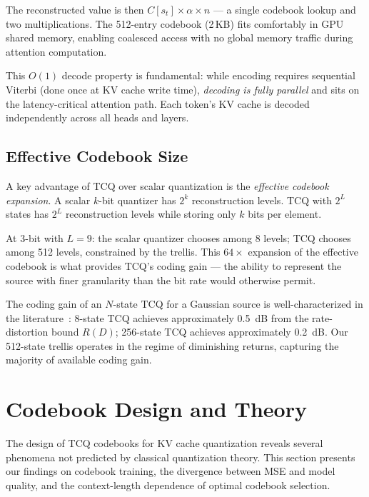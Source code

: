\documentclass{article}
\begin{document}
The reconstructed value is then $C[s_t] \times \alpha \times n$ — a single
codebook lookup and two multiplications. The 512-entry codebook (2\,KB) fits
comfortably in GPU shared memory, enabling coalesced access with no global
memory traffic during attention computation.

This $O(1)$ decode property is fundamental: while encoding requires sequential
Viterbi (done once at KV cache write time), \emph{decoding is fully parallel}
and sits on the latency-critical attention path. Each token's KV cache is
decoded independently across all heads and layers.

\subsection{Effective Codebook Size}
\label{sec:effective_codebook}

A key advantage of TCQ over scalar quantization is the \emph{effective codebook
expansion}. A scalar $k$-bit quantizer has $2^k$ reconstruction levels. TCQ
with $2^L$ states has $2^L$ reconstruction levels while storing only $k$ bits
per element.

At 3-bit with $L = 9$: the scalar quantizer chooses among 8 levels; TCQ chooses
among 512 levels, constrained by the trellis. This $64\times$ expansion of the
effective codebook is what provides TCQ's coding gain — the ability to represent
the source with finer granularity than the bit rate would otherwise permit.

The coding gain of an $N$-state TCQ for a Gaussian source is well-characterized
in the literature~\cite{marcellin1990tcq,fischer1992ectcq}: 8-state TCQ
achieves approximately 0.5~dB from the rate-distortion bound $R(D)$; 256-state
TCQ achieves approximately 0.2~dB. Our 512-state trellis operates in the regime
of diminishing returns, capturing the majority of available coding gain.


\section{Codebook Design and Theory}
\label{sec:codebook}

The design of TCQ codebooks for KV cache quantization reveals several phenomena
not predicted by classical quantization theory. This section presents our
findings on codebook training, the divergence between MSE and model quality, and
the context-length dependence of optimal codebook selection.
\end{document}
